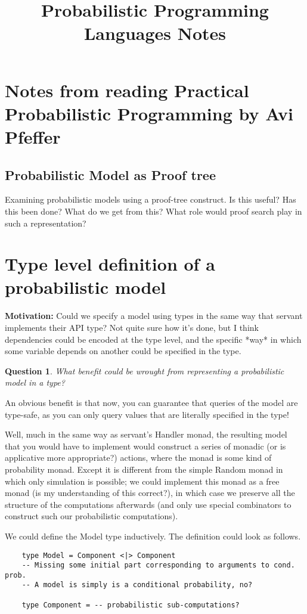 \documentclass{article}
\title{Probabilistic Programming Languages Notes}
\theoremstyle{definition}
\newtheorem{qst}{Question}
\begin{document}
\maketitle

\section{Notes from reading Practical Probabilistic Programming by Avi Pfeffer}

\subsection{Probabilistic Model as Proof tree}

Examining probabilistic models using a proof-tree construct.
Is this useful? Has this been done? What do we get from this?
What role would proof search play in such a representation?

\section{Type level definition of a probabilistic model}

\textbf{Motivation:} Could we specify a model using types in the same way that
servant implements their API type? Not quite sure how it's
done, but I think dependencies could be encoded at the type
level, and the specific *way* in which some variable depends
on another could be specified in the type.

\begin{qst}
    \emph{What benefit could be wrought from representing a probabilistic model in a type?}

    An obvious benefit is that now, you can guarantee that queries of
    the model are type-safe, as you can only query values
    that are literally specified in the type!

    Well, much in the same way as servant's Handler monad, the resulting
    model that you would have to implement would construct
    a series of monadic (or is applicative more appropriate?)
    actions, where the monad is some kind of probability monad.
    Except it is different from the simple Random monad in
    which only simulation is possible; we could implement
    this monad as a free monad (is my understanding of this
    correct?), in which case we preserve all
    the structure of the computations afterwards (and only use
    special combinators to construct such our probabilistic
    computations).

    We could define the Model type inductively. The definition
    could look as follows.

    \begin{lstlisting}
    type Model = Component <|> Component
    -- Missing some initial part corresponding to arguments to cond. prob.
    -- A model is simply is a conditional probability, no?

    type Component = -- probabilistic sub-computations?
    \end{lstlisting}
\end{qst}
\end{document}

